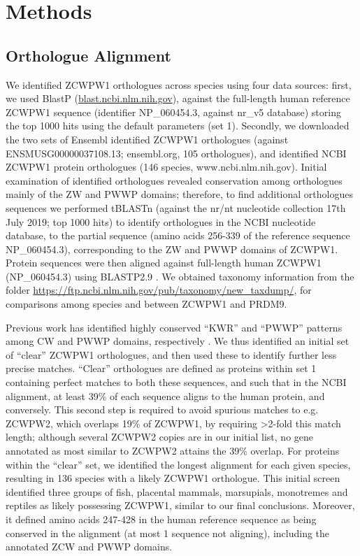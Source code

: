 \section{Methods}
\subsection{Orthologue Alignment}
\label{sec:orthologues}
We identified ZCWPW1 orthologues across species using four data sources: first, we used BlastP (\url{blast.ncbi.nlm.nih.gov}), against the full-length human reference ZCWPW1 sequence (identifier NP\_060454.3, against nr\_v5 database) storing the top 1000 hits using the default parameters (set 1).
Secondly, we downloaded the two sets of Ensembl identified ZCWPW1 orthologues (against ENSMUSG00000037108.13; ensembl.org, 105 orthologues), and identified NCBI ZCWPW1 protein orthologues (146 species, www.ncbi.nlm.nih.gov).
Initial examination of identified orthologues revealed conservation among orthologues mainly of the ZW and PWWP domains; therefore, to find additional orthologues sequences we performed tBLASTn (against the nr/nt nucleotide collection 17th July 2019; top 1000 hits) to identify orthologues in the NCBI nucleotide database, to the partial sequence (amino acids 256-339 of the reference sequence NP\_060454.3), corresponding to the ZW and PWWP domains of ZCWPW1.
Protein sequences were then aligned against full-length human ZCWPW1 (NP\_060454.3) using BLASTP2.9 \parencite{Altschul1997Gapped,Altschul2005Protein}.
We obtained taxonomy information from the folder \url{https://ftp.ncbi.nlm.nih.gov/pub/taxonomy/new_taxdump/}, for comparisons among species and between ZCWPW1 and PRDM9.

Previous work has identified highly conserved “KWR” and “PWWP” patterns among CW and PWWP domains, respectively \parencite{He2010Structural, Qin2014Structure}.
We thus identified an initial set of “clear” ZCWPW1 orthologues, and then used these to identify further less precise matches.
“Clear” orthologues are defined as proteins within set 1 containing perfect matches to both these sequences, and such that in the NCBI alignment, at least 39\% of each sequence aligns to the human protein, and conversely.
This second step is required to avoid spurious matches to e.g. ZCWPW2, which overlaps 19\% of ZCWPW1, by requiring >2-fold this match length; although several ZCWPW2 copies are in our initial list, no gene annotated as most similar to ZCWPW2 attains the 39\% overlap.
For proteins within the “clear” set, we identified the longest alignment for each given species, resulting in 136 species with a likely ZCWPW1 orthologue.
This initial screen identified three groups of fish, placental mammals, marsupials, monotremes and reptiles as likely possessing ZCWPW1, similar to our final conclusions.
Moreover, it defined amino acids 247-428 in the human reference sequence as being conserved in the alignment (at most 1 sequence not aligning), including the annotated ZCW and PWWP domains.

